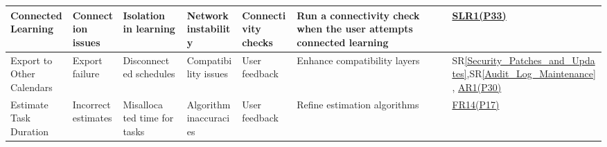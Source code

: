 \documentclass{article}
\newcommand{\srref}[1]{SR\ref{#1}}
\begin{document}
\begin{longtable}{|p{1.5cm}|p{1.5cm}|p{1.5cm}|p{2cm}|p{2cm}|p{2cm}|p{1.8cm}|}
  \hline
  Connected Learning & Connection issues & Isolation in learning & Network instability & Connectivity checks & Run a connectivity check when the user attempts connected learning & \href{https://github.com/wangq131/4G06CapstoneProjectT5/blob/689841fefc298f80d84232996e1c7ca7981dd93d/docs/SRS/SRS.pdf}{SLR1(P33)} \\
  \hline
  Export to Other Calendars & Export failure & Disconnect \-ed schedules & Compatibility issues & User feedback & Enhance compatibility layers & \srref{Security_Patches_and_Updates},\srref{Audit_Log_Maintenance}, \href{https://github.com/wangq131/4G06CapstoneProjectT5/blob/689841fefc298f80d84232996e1c7ca7981dd93d/docs/SRS/SRS.pdf}{AR1(P30)} \\
  \hline
  Estimate Task Duration & Incorrect estimates & Misalloca \-ted time for tasks & Algorithm inaccuracies & User feedback & Refine estimation algorithms & \href{https://github.com/wangq131/4G06CapstoneProjectT5/blob/689841fefc298f80d84232996e1c7ca7981dd93d/docs/SRS/SRS.pdf}{FR14(P17)} \\
  \hline
  \end{longtable}

  
  \pagestyle{plain}%
  \clearpage %
\end{document}
